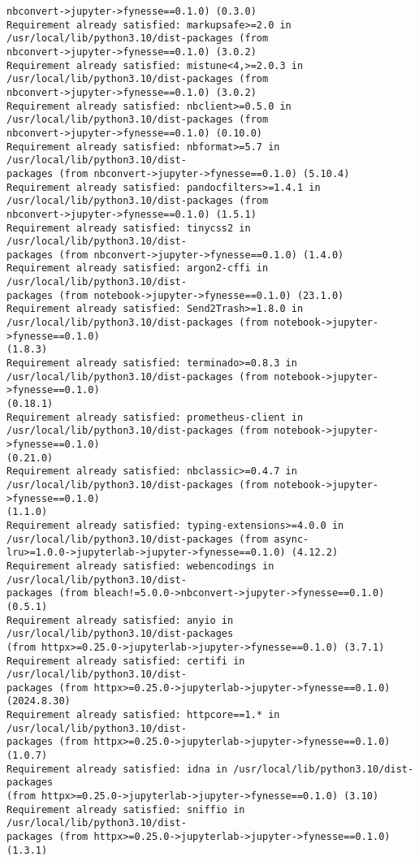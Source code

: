\documentclass[11pt]{article}
\begin{document}
\begin{Verbatim}[commandchars=\\\{\}]
nbconvert->jupyter->fynesse==0.1.0) (0.3.0)
Requirement already satisfied: markupsafe>=2.0 in
/usr/local/lib/python3.10/dist-packages (from
nbconvert->jupyter->fynesse==0.1.0) (3.0.2)
Requirement already satisfied: mistune<4,>=2.0.3 in
/usr/local/lib/python3.10/dist-packages (from
nbconvert->jupyter->fynesse==0.1.0) (3.0.2)
Requirement already satisfied: nbclient>=0.5.0 in
/usr/local/lib/python3.10/dist-packages (from
nbconvert->jupyter->fynesse==0.1.0) (0.10.0)
Requirement already satisfied: nbformat>=5.7 in /usr/local/lib/python3.10/dist-
packages (from nbconvert->jupyter->fynesse==0.1.0) (5.10.4)
Requirement already satisfied: pandocfilters>=1.4.1 in
/usr/local/lib/python3.10/dist-packages (from
nbconvert->jupyter->fynesse==0.1.0) (1.5.1)
Requirement already satisfied: tinycss2 in /usr/local/lib/python3.10/dist-
packages (from nbconvert->jupyter->fynesse==0.1.0) (1.4.0)
Requirement already satisfied: argon2-cffi in /usr/local/lib/python3.10/dist-
packages (from notebook->jupyter->fynesse==0.1.0) (23.1.0)
Requirement already satisfied: Send2Trash>=1.8.0 in
/usr/local/lib/python3.10/dist-packages (from notebook->jupyter->fynesse==0.1.0)
(1.8.3)
Requirement already satisfied: terminado>=0.8.3 in
/usr/local/lib/python3.10/dist-packages (from notebook->jupyter->fynesse==0.1.0)
(0.18.1)
Requirement already satisfied: prometheus-client in
/usr/local/lib/python3.10/dist-packages (from notebook->jupyter->fynesse==0.1.0)
(0.21.0)
Requirement already satisfied: nbclassic>=0.4.7 in
/usr/local/lib/python3.10/dist-packages (from notebook->jupyter->fynesse==0.1.0)
(1.1.0)
Requirement already satisfied: typing-extensions>=4.0.0 in
/usr/local/lib/python3.10/dist-packages (from async-
lru>=1.0.0->jupyterlab->jupyter->fynesse==0.1.0) (4.12.2)
Requirement already satisfied: webencodings in /usr/local/lib/python3.10/dist-
packages (from bleach!=5.0.0->nbconvert->jupyter->fynesse==0.1.0) (0.5.1)
Requirement already satisfied: anyio in /usr/local/lib/python3.10/dist-packages
(from httpx>=0.25.0->jupyterlab->jupyter->fynesse==0.1.0) (3.7.1)
Requirement already satisfied: certifi in /usr/local/lib/python3.10/dist-
packages (from httpx>=0.25.0->jupyterlab->jupyter->fynesse==0.1.0) (2024.8.30)
Requirement already satisfied: httpcore==1.* in /usr/local/lib/python3.10/dist-
packages (from httpx>=0.25.0->jupyterlab->jupyter->fynesse==0.1.0) (1.0.7)
Requirement already satisfied: idna in /usr/local/lib/python3.10/dist-packages
(from httpx>=0.25.0->jupyterlab->jupyter->fynesse==0.1.0) (3.10)
Requirement already satisfied: sniffio in /usr/local/lib/python3.10/dist-
packages (from httpx>=0.25.0->jupyterlab->jupyter->fynesse==0.1.0) (1.3.1)

\end{Verbatim}
\end{document}
